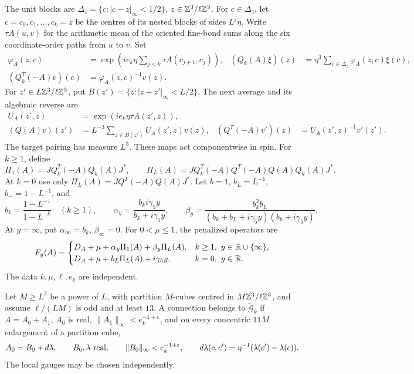The unit blocks are
\(\Delta_z=\{c:|c-z|_\infty<1/2\}\), \(z\in\mathbb Z^3/\ell\mathbb Z^3\).
For \(c\in\Delta_z\), let \(c=c_0,c_1,\ldots,c_k=z\) be the
centres of its nested blocks of sides \(L^j\eta\).
Write \(\tau A(u,v)\) for the arithmetic mean of the oriented
fine-bond sums along the six coordinate-order paths from \(u\) to \(v\).
Set
\[
 \begin{aligned}
 \varphi_A(z,c)&=\exp\!\left(ie_k\eta
                    \sum_{j<k}\tau A(c_{j+1},c_j)\right),&
 (Q_k(A)\xi)(z)&=\eta^3\sum_{c\in\Delta_z}\varphi_A(z,c)\xi(c),\\
 (Q_k^T(-A)v)(c)&=\varphi_A(z,c)^{-1}v(z).&&
 \end{aligned}
\]
For \(z'\in L\mathbb Z^3/\ell\mathbb Z^3\), put \(B(z')=\{z:|z-z'|_\infty<L/2\}\).
The next average and its algebraic reverse are
\[
 \begin{aligned}
 U_A(z',z)&=\exp(ie_k\eta\tau A(z',z)),\\
 (Q(A)v)(z')&=L^{-3}\sum_{z\in B(z')}U_A(z',z)v(z),&
 (Q^T(-A)v')(z)&=U_A(z',z)^{-1}v'(z').
 \end{aligned}
\]
The target pairing has measure \(L^3\). These maps act componentwise
in spin. For \(k\ge1\), define
\[
 \Pi_1(A)=JQ_k^T(-A)Q_k(A)J^*,\qquad
 \Pi_L(A)=JQ_k^T(-A)Q^T(-A)Q(A)Q_k(A)J^*.
\]
At \(k=0\) use only \(\Pi_L(A)=JQ^T(-A)Q(A)J^*\).
Let \(b=1\), \(b_L=L^{-1}\), \(b_-=1-L^{-1}\), and
\[
 b_k=\frac{1-L^{-1}}{1-L^{-k}}\quad(k\ge1),\qquad
 \alpha_y=\frac{b_ki\gamma_5y}{b_k+i\gamma_5y},\qquad
 \beta_y=\frac{b_k^2b_L}{(b_k+b_L+i\gamma_5y)(b_k+i\gamma_5y)}.
\]
At \(y=\infty\), put \(\alpha_\infty=b_k\), \(\beta_\infty=0\).
For \(0<\mu\le1\), the penalized operators are
\begin{equation}\label{eq:intro-penalized-operator}
 F_y(A)=
 \begin{cases}
 D_A+\mu+\alpha_y\Pi_1(A)+\beta_y\Pi_L(A),
      & k\ge1,\ y\in\mathbb R\cup\{\infty\},\\
 D_A+\mu+b_L\Pi_L(A)+i\gamma_5y,
      & k=0,\ y\in\mathbb R.
 \end{cases}
\end{equation}
The data \(k,\mu,\ell,e_k\) are independent.

Let \(M\ge L^2\) be a power of \(L\), with partition \(M\)-cubes
centred in \(M\mathbb Z^3/\ell\mathbb Z^3\), and assume \(\ell/(LM)\) is odd
and at least \(13\). A connection belongs to
\(\widetilde{\mathcal G}_k\) if \(A=A_0+A_1\), \(A_0\) is real,
\(\|A_1\|_\infty<e_k^{-1+\varepsilon}\), and on every concentric
\(11M\) enlargement of a partition cube,
\[
 A_0=B_0+d\lambda,\qquad B_0,\lambda\ \hbox{real},\qquad
 \|B_0\|_\infty<e_k^{-1+\varepsilon},\qquad
 d\lambda(c,c')=\eta^{-1}(\lambda(c')-\lambda(c)).
\]
The local gauges may be chosen independently.

